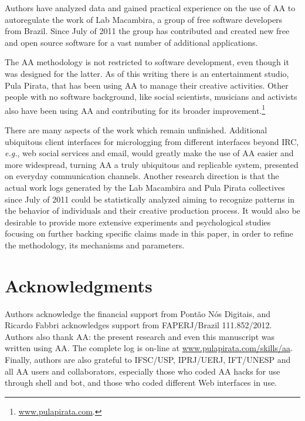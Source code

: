 \documentclass{article}
\newcommand{\eg}{{\it e.g.}}
\newcommand{\indraftnote}[1]{}
\newcommand{\todo}[1]{\indraftnote{todo: #1}}
\begin{document}
Authors have analyzed data and gained practical experience on
the use of AA to autoregulate the work of Lab Macambira, a group of free
software developers from Brazil. Since July of 2011 the group has contributed
and created new free and open source software for a vast number of additional applications.

The AA methodology is not restricted to software development, even though it was
designed for the latter. As of this writing there is an entertainment studio,
Pula Pirata, that has been using AA to manage their creative activities.  Other people with no software background,
like social scientists, musicians and activists also have been using AA and
contributing for its broader improvement.\footnote{ \url{www.pulapirata.com}.}

There are many aspects of the work which remain unfinished. Additional
ubiquitous client interfaces for micrologging from different interfaces beyond
IRC, \eg, web social services and email, would greatly make the use of AA easier
and more widespread, turning AA a truly ubiquitous and replicable system,
presented on everyday communication channels. Another research direction is that
the actual work logs generated by the Lab Macambira and Pula Pirata collectives
since July of 2011 could be statistically analyzed aiming to recognize
patterns in the behavior of individuals and their creative production process.
It would also be desirable to provide more extensive experiments and
psychological studies focusing on further backing specific claims made in this
paper, in order to refine the methodology, its mechanisms and parameters.


\section*{Acknowledgments}
Authors acknowledge the financial support from Pont\~{a}o N\'{o}s Digitais, and
Ricardo Fabbri acknowledges support from FAPERJ/Brazil 111.852/2012.
Authors also thank AA: the present research and even this
manuscript was written using AA. The complete log is on-line at
\url{www.pulapirata.com/skills/aa}. Finally, authors are also grateful to IFSC/USP, IPRJ/UERJ, IFT/UNESP and all AA users and collaborators, especially those who coded AA hacks for use through shell and bot, and those who coded different Web interfaces in use.


\nocite{last2003}
\nocite{german2003}
\nocite{carmel1999}
\nocite{carmel2001}
\nocite{komi2005}
\nocite{battin2001}

%
%


\end{document}
